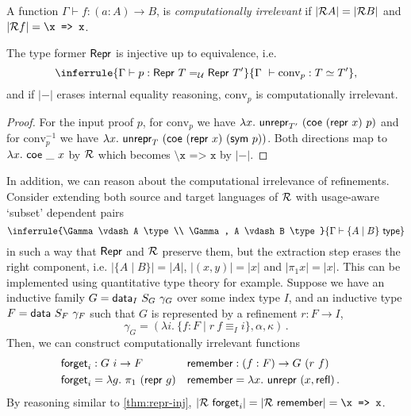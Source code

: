 \newcommand{\Pid}{\ensuremath{\texttt{\textbackslash x => x}}}

\begin{definition}
    A function $\Gamma \vdash f : (a : A) \to B$, is \emph{computationally irrelevant} if
    $|\mathcal{R} A| = |\mathcal{R} B|$ and $|\R f| = \Pid$.
\end{definition}

\begin{theorem}
  \label{thm:repr-inj}
	The type former $\textsf{Repr}{}$ is injective up to equivalence, i.e.
	\begin{equation}
	\inferrule{\Gamma \vdash p : \MRepr\ T =_{\univ} \MRepr\ T'}{\Gamma\ \vdash \text{conv}_p : T \simeq T'},
	\end{equation}
	 and if $|-|$ erases internal equality reasoning, $\text{conv}_p$ is computationally irrelevant.
	\begin{proof}
	For the input proof $p$, for $\text{conv}_p$ we have
	$\lambda x.\ \Munrepr_{T'}\ (\mta{coe}\ (\Mrepr\ x)\ p)$
	and for $\text{conv}_p^{-1}$ we have
	$\lambda x.\ \Munrepr_{T}\ (\mta{coe}\ (\Mrepr\ x)\ (\mta{sym}\
	p))$. Both directions map to $\lambda x.\ \textsf{coe}\ \_\ x$ by $\mathcal{R}$ which becomes \Pid{} by $|-|$.
	\end{proof}
\end{theorem}

In addition, we can reason about the computational irrelevance of
refinements. Consider extending both source and target languages of $\mathcal{R}$ with
usage-aware `subset' dependent pairs
\[
\inferrule{\Gamma \vdash A \type \\ \Gamma, A \vdash B \type}{\Gamma \vdash \{A \mid B\} \type}
\]
in such a way that $\textsf{Repr}$ and $\mathcal{R}$ preserve them, but the extraction step
erases the right component, i.e. $|\{A \mid B\}| = |A|$, $|(x, y)| = |x|$ and
$|\pi_1 x| = |x|$. This can be implemented using quantitative type
theory for example. Suppose we have an inductive family $G = \textsf{data}_I\ S_G\
\gamma_G$ over some index type $I$, and an inductive type $F = \textsf{data}\ S_F\
\gamma_F$ such that $G$ is represented by a refinement $r : F \to I$,
\[
    \gamma_G = (\lambda i.\ \{ f : F \mid r\ f \equiv_I i \}, \alpha, \kappa) \,.
\]
Then, we can construct computationally irrelevant functions
\begin{align*}
&\begin{aligned}
&\textsf{forget}_i : G\ i \to F \\
&\textsf{forget}_i = \lambda g.\ \pi_1\ (\textsf{repr}\ g)
\end{aligned} \quad \begin{aligned}
&\textsf{remember} : (f : F) \to G\ (r\ f) \\
&\textsf{remember} = \lambda x.\ \textsf{unrepr}\ (x, \textsf{refl}) \,.
\end{aligned}
\end{align*}
By reasoning similar to \cref{thm:repr-inj}, $|\R\ \mta{forget}_i| = |\R\
\mta{remember}| = \Pid$.
